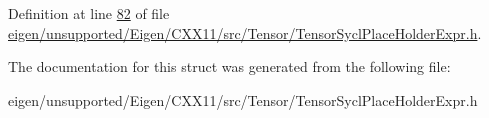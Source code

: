 Definition at line \hyperlink{eigen_2unsupported_2_eigen_2_c_x_x11_2src_2_tensor_2_tensor_sycl_place_holder_expr_8h_source_l00082}{82} of file \hyperlink{eigen_2unsupported_2_eigen_2_c_x_x11_2src_2_tensor_2_tensor_sycl_place_holder_expr_8h_source}{eigen/unsupported/\+Eigen/\+C\+X\+X11/src/\+Tensor/\+Tensor\+Sycl\+Place\+Holder\+Expr.\+h}.



The documentation for this struct was generated from the following file\+:\begin{DoxyCompactItemize}
\item 
eigen/unsupported/\+Eigen/\+C\+X\+X11/src/\+Tensor/\+Tensor\+Sycl\+Place\+Holder\+Expr.\+h\end{DoxyCompactItemize}
